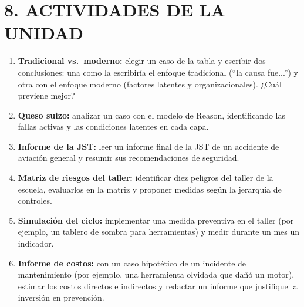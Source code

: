 \section*{8. ACTIVIDADES DE LA UNIDAD}
\begin{enumerate}
  \item \textbf{Tradicional vs.\ moderno:} elegir un caso de la tabla y escribir dos conclusiones:
        una como la escribiría el enfoque tradicional (``la causa fue...'') y otra con el enfoque
        moderno (factores latentes y organizacionales). ¿Cuál previene mejor?
  \item \textbf{Queso suizo:} analizar un caso con el modelo de Reason, identificando las fallas
        activas y las condiciones latentes en cada capa.
  \item \textbf{Informe de la JST:} leer un informe final de la JST de un accidente de aviación
        general y resumir sus recomendaciones de seguridad.
  \item \textbf{Matriz de riesgos del taller:} identificar diez peligros del taller de la escuela,
        evaluarlos en la matriz y proponer medidas según la jerarquía de controles.
  \item \textbf{Simulación del ciclo:} implementar una medida preventiva en el taller (por ejemplo,
        un tablero de sombra para herramientas) y medir durante un mes un indicador.
  \item \textbf{Informe de costos:} con un caso hipotético de un incidente de mantenimiento (por
        ejemplo, una herramienta olvidada que dañó un motor), estimar los costos directos e
        indirectos y redactar un informe que justifique la inversión en prevención.
\end{enumerate}

